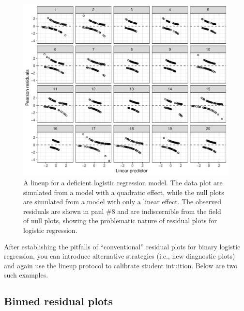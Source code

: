 \documentclass[12pt]{article}
\begin{document}
\begin{figure}
\centering
\includegraphics{figs/logistic_residuals_bad.pdf}
\caption{\label{fig:logisticissue} A lineup for a deficient logistic
regression model. The data plot are simulated from a model with a
quadratic effect, while the null plots are simulated from a model with
only a linear effect. The observed residuals are shown in panl \#8 and
are indiscernible from the field of null plots, showing the problematic
nature of residual plots for logistic regression.}
\end{figure}

After establishing the pitfalls of ``conventional'' residual plots for
binary logistic regression, you can introduce alternative strategies
(i.e., new diagnostic plots) and again use the lineup protocol to
calibrate student intuition. Below are two such examples.

\hypertarget{binned-residual-plots}{%
\subsection{Binned residual plots}\label{binned-residual-plots}}
\end{document}
